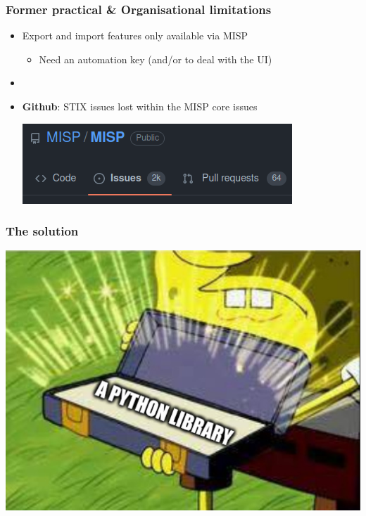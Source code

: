 \begin{frame}
    \frametitle{Former practical \& Organisational limitations}
    \begin{itemize}
        \item Export and import features only available via MISP
        \begin{itemize}
            \item Need an automation key (and/or to deal with the UI)
        \end{itemize}
        \item []
        \item {\bf Github}: STIX issues lost within the MISP core issues
        \pause
        \vspace{4em}
        \begin{center}
            \includegraphics[scale=0.4]{images/issues.png}
        \end{center}
    \end{itemize}
\end{frame}

\begin{frame}
    \frametitle{The solution}
    \begin{center}
        \includegraphics[scale=0.3]{images/solution.png}
    \end{center}
\end{frame}

